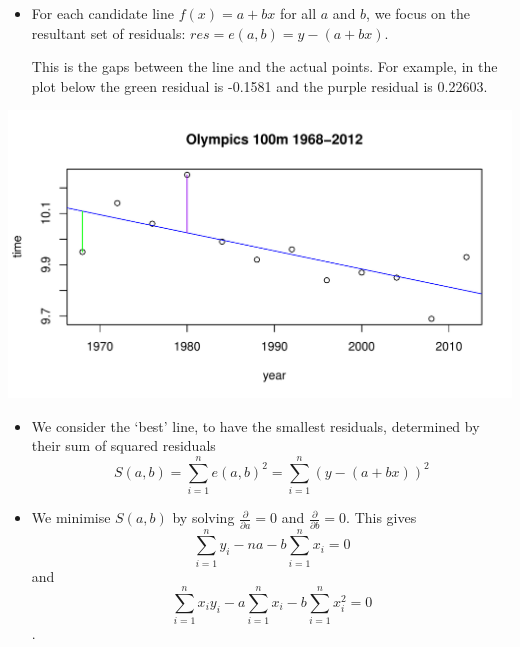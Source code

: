 \documentclass[t,xcolor=pdftex,dvipsnames,table]{beamer}
\makeatletter
\def\maxwidth{ %
  \ifdim\Gin@nat@width>\linewidth
    \linewidth
  \else
    \Gin@nat@width
  \fi
}
\newenvironment{knitrout}{}{} %
\makeatother
\begin{document}
\begin{frame}[fragile]{}
\begin{itemize}

\item 
For each candidate line $f(x)= a+bx$ for all $a$ and $b$, we focus on the resultant set of residuals: $res = e(a,b) = y-(a+bx)$. 

\vspace{.5cm}
This is the gaps between the line and the actual points.
For example, in the plot below the green residual is -0.1581 and the purple residual is 0.22603.
\end{itemize}

\begin{knitrout}
\color{fgcolor}
\includegraphics[width=\maxwidth]{figure/unnamed-chunk-4-1} 

\end{knitrout}
\end{frame}

\begin{frame}[fragile]{}

\begin{itemize}
\item   
We consider the `best’ line, to have the smallest residuals, determined by their sum of squared residuals 
\[ S(a,b)= \sum_{i=1}^{n} e(a,b)^2 = \sum_{i=1}^{n} (y - (a+bx))^2 \]

\item   
We minimise $S(a,b)$  by solving  $\frac{ \partial}{\partial a} = 0$ and 
$\frac{ \partial}{\partial b} = 0$. This gives 
 \[ \sum_{i=1}^{n} y_{i} - na - b \sum_{i=1}^{n} x_{i} = 0 \]
and
\[\sum_{i=1}^{n} x_{i} y_{i}  -  a \sum_{i=1}^{n} x_{i}   - b \sum_{i=1}^{n} x_{i}^2 = 0 \].

\end{itemize}
\end{frame}
\end{document}
